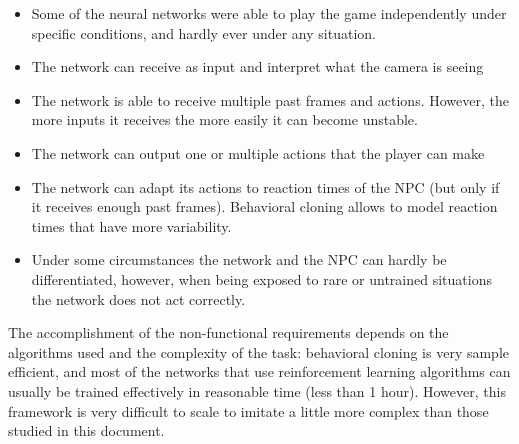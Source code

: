 \begin{itemize}
	\item Some of the neural networks were able to play the game independently under specific conditions, and hardly ever under any situation.
	\item The network can receive as input and interpret what the camera is seeing
	\item The network is able to receive multiple past frames and actions. However, the more inputs it receives the more easily it can become unstable.
	\item The network can output one or multiple actions that the player can make
	\item The network can adapt its actions to reaction times of the NPC (but only if it receives enough past frames). Behavioral cloning allows to model reaction times that have more variability.
	\item Under some circumstances the network and the NPC can hardly be differentiated, however, when being exposed to rare or untrained situations the network does not act correctly.
\end{itemize}

The accomplishment of the non-functional requirements depends on the algorithms used and the complexity of the task: behavioral cloning is very sample efficient, and most of the networks that use reinforcement learning algorithms can usually be trained effectively in reasonable time (less than 1 hour). However, this framework is very difficult to scale to imitate a little more complex than those studied in this document.




